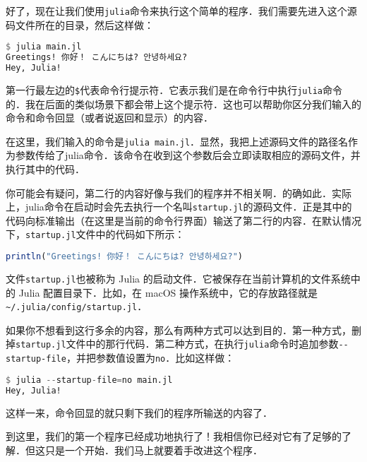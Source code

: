 好了，现在让我们使用\verb|julia|命令来执行这个简单的程序．我们需要先进入这个源码文件所在的目录，然后这样做：
\begin{lstlisting}[language=julia]
$ julia main.jl 
Greetings! 你好！ こんにちは? 안녕하세요?
Hey, Julia!
\end{lstlisting}

第一行最左边的\verb|$|代表命令行提示符．它表示我们是在命令行中执行\verb|julia|命令的．我在后面的类似场景下都会带上这个提示符．这也可以帮助你区分我们输入的命令和命令回显（或者说返回和显示）的内容．

在这里，我们输入的命令是\verb|julia main.jl|．显然，我把上述源码文件的路径名作为参数传给了julia命令．该命令在收到这个参数后会立即读取相应的源码文件，并执行其中的代码．

你可能会有疑问，第二行的内容好像与我们的程序并不相关啊．的确如此．实际上，julia命令在启动时会先去执行一个名叫\verb|startup.jl|的源码文件．正是其中的代码向标准输出（在这里是当前的命令行界面）输送了第二行的内容．在默认情况下，\verb|startup.jl|文件中的代码如下所示：
\begin{lstlisting}[language=julia]
println("Greetings! 你好！ こんにちは? 안녕하세요?")
\end{lstlisting}

文件\verb|startup.jl|也被称为 Julia 的启动文件．它被保存在当前计算机的文件系统中的 Julia 配置目录下．比如，在 macOS 操作系统中，它的存放路径就是\verb|~/.julia/config/startup.jl|．

如果你不想看到这行多余的内容，那么有两种方式可以达到目的．第一种方式，删掉\verb|startup.jl|文件中的那行代码．第二种方式，在执行\verb|julia|命令时追加参数\verb|--startup-file|，并把参数值设置为\verb|no|．比如这样做：
\begin{lstlisting}[language=julia]
$ julia --startup-file=no main.jl
Hey, Julia!
\end{lstlisting}
这样一来，命令回显的就只剩下我们的程序所输送的内容了．

到这里，我们的第一个程序已经成功地执行了！我相信你已经对它有了足够的了解．但这只是一个开始．我们马上就要着手改进这个程序．